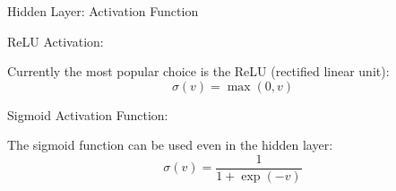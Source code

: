 \documentclass[11pt,compress,t,notes=noshow, xcolor=table]{beamer}
\begin{document}
\begin{vbframe}{Hidden Layer: Activation Function}
\begin{blocki}{ReLU Activation:}
\item Currently the most popular choice is the ReLU (rectified linear unit):
$$ \sigma (v) = \max(0,v) $$
\end{blocki}
\begin{figure}
\end{figure}
\framebreak


\begin{blocki}{Sigmoid Activation Function:}
\item The sigmoid function can be used even in the hidden layer:
$$ \sigma(v) = \frac{1}{1+\exp (-v)} $$
\end{blocki}
\begin{figure}
\end{figure}
\end{vbframe}







\endlecture
\end{document}
